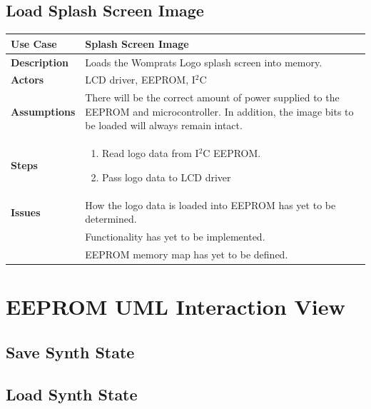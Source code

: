 \documentclass{article}
\begin{document}
\subsection{Load Splash Screen Image}
\begin{tabular}{|p{1in}|p{5in}|}
\hline
\textbf{Use Case} & Splash Screen Image\\
\hline
\textbf{Description} & Loads the Womprats Logo splash screen into memory.\\
\hline
\textbf{Actors} & LCD driver, EEPROM, I$^2$C\\
\hline
\textbf{Assumptions} & There will be the correct amount of power supplied to the EEPROM and microcontroller.  In addition, the image bits to be loaded will always remain intact.\\
\hline
\textbf{Steps} & \begin{enumerate}
\item Read logo data from I$^2$C EEPROM.
\item Pass logo data to LCD driver
\end{enumerate}\\
\hline
\textbf{Issues} & How the logo data is loaded into EEPROM has yet to be determined.\\
& Functionality has yet to be implemented.\\
& EEPROM memory map has yet to be defined.\\
\hline
\end{tabular}

\section{EEPROM UML Interaction View}
\subsection{Save Synth State}
\subsection{Load Synth State}
\end{document}
